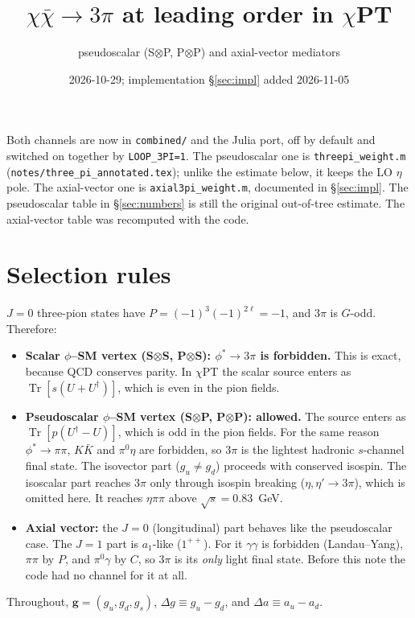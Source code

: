 \documentclass{article}
\title{$\chi\bar\chi\to3\pi$ at leading order in $\chi$PT}
\author{pseudoscalar (S$\otimes$P, P$\otimes$P) and axial-vector mediators}
\date{2026-10-29; implementation \S\ref{sec:impl} added 2026-11-05}
\newcommand{\tr}{\operatorname{Tr}}
\newcommand{\Dg}{\Delta g}
\newcommand{\Da}{\Delta a}
\begin{document}
\maketitle

\noindent
Both channels are now in \texttt{combined/} and the Julia port, off by default and switched on
together by \texttt{LOOP\_3PI=1}. The pseudoscalar one is \texttt{threepi\_weight.m}
(\texttt{notes/three\_pi\_annotated.tex}); unlike the estimate below, it keeps the LO $\eta$ pole.
The axial-vector one is \texttt{axial3pi\_weight.m}, documented in \S\ref{sec:impl}. The
pseudoscalar table in \S\ref{sec:numbers} is still the original out-of-tree estimate. The
axial-vector table was recomputed with the code.

\section{Selection rules}

$J=0$ three-pion states have $P=(-1)^3(-1)^{2\ell}=-1$, and $3\pi$ is
$G$-odd. Therefore:
\begin{itemize}
\item \textbf{Scalar $\phi$--SM vertex (S$\otimes$S, P$\otimes$S): $\phi^*\to3\pi$ is forbidden.}
  This is exact, because QCD conserves parity. In $\chi$PT the scalar source enters as
  $\tr[s(U+U^\dagger)]$, which is even in the pion fields.
\item \textbf{Pseudoscalar $\phi$--SM vertex (S$\otimes$P, P$\otimes$P): allowed.}
  The source enters as $\tr[p(U^\dagger-U)]$, which is odd in the pion fields. For the same reason
  $\phi^*\to\pi\pi$, $K\bar K$ and $\pi^0\eta$ are forbidden, so $3\pi$ is the lightest hadronic
  $s$-channel final state. The isovector part ($g_u\neq g_d$) proceeds with conserved isospin.
  The isoscalar part reaches $3\pi$ only through isospin breaking ($\eta,\eta'\to3\pi$), which is
  omitted here. It reaches $\eta\pi\pi$ above $\sqrt s=0.83$~GeV.
\item \textbf{Axial vector:} the $J=0$ (longitudinal) part behaves like the pseudoscalar case.
  The $J=1$ part is $a_1$-like ($1^{++}$). For it $\gamma\gamma$ is forbidden (Landau--Yang),
  $\pi\pi$ by $P$, and $\pi^0\gamma$ by $C$, so $3\pi$ is its \emph{only} light final state.
  Before this note the code had no channel for it at all.
\end{itemize}
Throughout, $\mathbf g=(g_u,g_d,g_s)$, $\Dg\equiv g_u-g_d$, and $\Da\equiv a_u-a_d$.
\end{document}
